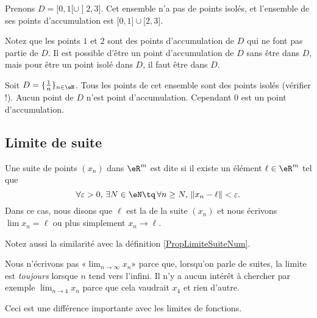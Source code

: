 \begin{example}
	Prenons $D=\mathopen[ 0 , 1 [\cup\mathopen] 2 , 3 \mathclose]$. Cet ensemble n'a pas de points isolés, et l'ensemble de ses points d'accumulation est $\mathopen[ 0 , 1 \mathclose]\cup\mathopen[ 2,3  \mathclose]$.

	Notez que les points $1$ et $2$ sont des points d'accumulation de $D$ qui ne font pas partie de $D$. Il est possible d'être un point d'accumulation de $D$ sans être dans $D$, mais pour être un point isolé dans $D$, il faut être dans $D$.
\end{example}

\begin{example}
	Soit $D=\{ \frac{1}{ n }\}_{n\in\eN}$. Tous les points de cet ensemble sont des points isolés (vérifier !).  Aucun point de $D$ n'est point d'accumulation. Cependant $0$ est un point d'accumulation.
\end{example}

\cite{GGIibHE}

\subsection{Limite de suite}

\begin{definition}
	Une suite de points $(x_n)$ dans $\eR^m$ est dite  si il existe un élément $\ell\in\eR^m$ tel que
	\begin{equation}	\label{EqCondLimSuite}
		\forall\varepsilon>0,\,\exists N\in \eN\tq\,\forall n\geq N,\,\| x_n-\ell \|<\varepsilon.
	\end{equation}
	Dans ce cas, nous disons que $\ell$ est la  de la suite $(x_n)$ et nous écrivons $\lim x_n=\ell$ ou plus simplement $x_n\to \ell$.
\end{definition}
Notez aussi la similarité avec la définition \ref{PropLimiteSuiteNum}.

\begin{remark}
	Nous n'écrivons pas «$\lim_{n\to\infty}x_n$» parce que, lorsqu'on parle de suites, la limite est \emph{toujours} lorsque $n$ tend vers l'infini. Il n'y a aucun intérêt à chercher par exemple $\lim_{n\to 4}x_n$ parce que cela vaudrait $x_4$ et rien d'autre.

	Ceci est une différence importante avec les limites de fonctions.
\end{remark}

